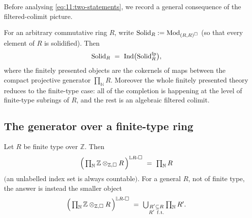 Before analysing \eqref{eq:11:two-statements}, we record a general
consequence of the filtered-colimit picture.

\begin{corollary}
\label{cor:11:completion-finite-type}
For an arbitrary commutative ring $R$, write $\mathrm{Solid}_{R}:=\operatorname{Mod}_{(R,R)^{\square}}$
(so that every element of $R$ is solidified). Then
\begin{equation*}
\Solid_{R}\ =\ \Ind\bigl(\Solid_{R}^{\mathrm{fp}}\bigr),
\end{equation*}
where the finitely presented objects are the cokernels of maps between the
compact projective generator $\prod_{\mathbb{N}}R$. Moreover the whole
finitely presented theory reduces to the finite-type case: all of the
completion is happening at the level of finite-type subrings of $R$, and the
rest is an algebraic filtered colimit.
\end{corollary}

\subsection{The generator over a finite-type ring}

\begin{proposition}
\label{prop:11:generator}
Let $R$ be finite type over $\mathbb{Z}$. Then
\begin{equation*}
\Bigl(\,\textstyle\prod_{\mathbb{N}}\mathbb{Z}\otimes_{\mathbb{Z},\solid}R\,
\Bigr)^{\mathbb{L}R\text{-}\solid}\ =\ \textstyle\prod_{\mathbb{N}}R
\end{equation*}
$($an unlabelled index set is always countable$)$. For a general $R$, not of
finite type, the answer is instead the smaller object
\begin{equation*}
\Bigl(\,\textstyle\prod_{\mathbb{N}}\mathbb{Z}\otimes_{\mathbb{Z},\square}R\,
\Bigr)^{\mathbb{L}R\text{-}\square}\ =\ \bigcup_{\substack{R'\subseteq R\\ R'\
\mathrm{f.t.}}} \textstyle\prod_{\mathbb{N}}R'.
\end{equation*}
\end{proposition}

